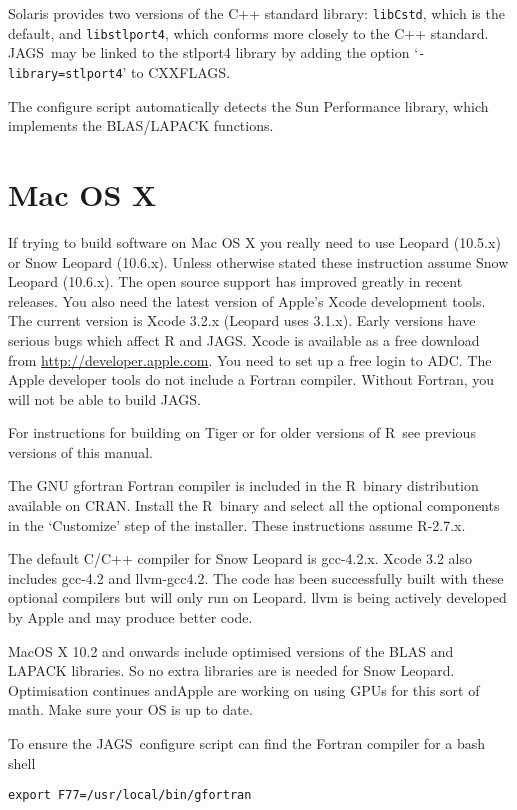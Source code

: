 \documentclass[11pt, a4paper, titlepage]{article}
\newcommand{\JAGS}{\textsf{JAGS}}
\newcommand{\R}{\textsf{R}}
\newcommand{\code}[1]{{\bgroup{\normalfont\ttfamily #1}\egroup}}
\newcommand{\samp}[1]{{`\bgroup\normalfont\texttt{#1}'\egroup}}
\let\option=\samp
\begin{document}
Solaris provides two versions of the C++ standard library:
\texttt{libCstd}, which is the default, and \texttt{libstlport4},
which conforms more closely to the C++ standard. \JAGS\ may be linked
to the stlport4 library by adding the option
\option{-library=stlport4} to \code{CXXFLAGS}. 

The configure script automatically detects the Sun Performance library,
which implements the BLAS/LAPACK functions.  

\clearpage
\section{Mac OS X}

If trying to build software on Mac OS X you really need to use Leopard
(10.5.x) or Snow Leopard (10.6.x). Unless otherwise stated these
instruction assume Snow Leopard (10.6.x). The open source support has
improved greatly in recent releases. You also need the latest version
of Apple's Xcode development tools. The current version is Xcode 3.2.x
(Leopard uses 3.1.x).  Early versions have serious bugs which affect R
and \JAGS.  Xcode is available as a free download from
\url{http://developer.apple.com}. You need to set up a free login to
ADC. The Apple developer tools do not include a Fortran
compiler. Without Fortran, you will not be able to build \JAGS.

For instructions for building on Tiger or for older versions of
\R\ see previous versions of this manual.

The GNU gfortran Fortran compiler is included in the \R\ binary
distribution available on CRAN. Install the \R\ binary and select all
the optional components in the `Customize' step of the installer.
These instructions assume R-2.7.x.

The default C/C++ compiler for Snow Leopard is gcc-4.2.x. Xcode 3.2
also includes gcc-4.2 and llvm-gcc4.2.  The code has been successfully
built with these optional compilers but will only run on Leopard.
llvm is being actively developed by Apple and may produce better code.

MacOS X 10.2 and onwards include optimised versions of the BLAS and
LAPACK libraries.  So no extra libraries are is needed for Snow
Leopard.  Optimisation continues andApple are working on using GPUs
for this sort of math.  Make sure your OS is up to date.

To ensure the \JAGS\ configure script can find the Fortran compiler
for a bash shell
\begin{verbatim}
export F77=/usr/local/bin/gfortran
\end{verbatim}
\end{document}
